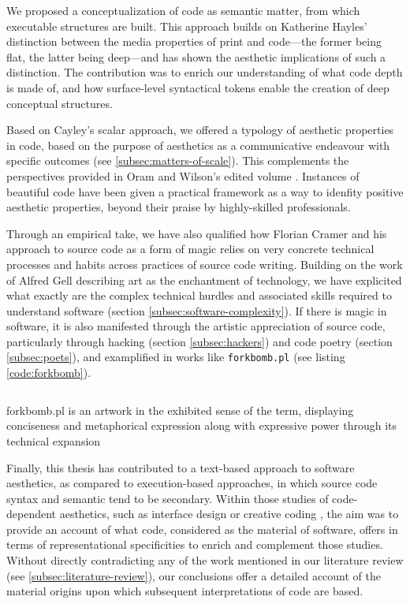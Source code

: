 We proposed a conceptualization of code as semantic matter, from which executable structures are built. This approach builds on Katherine Hayles' distinction between the media properties of print and code—the former being flat, the latter being deep—and has shown the aesthetic implications of such a distinction. The contribution was to enrich our understanding of what code depth is made of, and how surface-level syntactical tokens enable the creation of deep conceptual structures.

Based on Cayley's scalar approach, we offered a typology of aesthetic properties in code, based on the purpose of aesthetics as a communicative endeavour with specific outcomes (see \ref{subsec:matters-of-scale}). This complements the perspectives provided in Oram and Wilson's edited volume \citep{oram_beautiful_2007}. Instances of beautiful code have been given a practical framework as a way to idenfity positive aesthetic properties, beyond their praise by highly-skilled professionals.

Through an empirical take, we have also qualified how Florian Cramer and his approach to source code as a form of magic relies on very concrete technical processes and habits across practices of source code writing. Building on the work of Alfred Gell describing art as the enchantment of technology, we have explicited what exactly are the complex technical hurdles and associated skills required to understand software (section \ref{subsec:software-complexity}). If there is magic in software, it is also manifested through the artistic appreciation of source code, particularly through hacking (section \ref{subsec:hackers}) and code poetry (section \ref{subsec:poets}), and examplified in works like \lstinline{forkbomb.pl} (see listing \ref{code:forkbomb}).

\begin{listing}
    \inputminted{perl}{./corpus/forkbomb.pl}
    \caption{forkbomb.pl is an artwork in the exhibited sense of the term, displaying conciseness and metaphorical expression along with expressive power through its technical expansion}
    \label{code:forkbomb}
\end{listing}

Finally, this thesis has contributed to a text-based approach to software aesthetics, as compared to execution-based approaches, in which source code syntax and semantic tend to be secondary. Within those studies of code-dependent aesthetics, such as interface design \citep{fishwick_aesthetic_2000} or creative coding \citep{cox_aesthetic_2020}, the aim was to provide an account of what code, considered as the material of software, offers in terms of representational specificities to enrich and complement those studies. Without directly contradicting any of the work mentioned in our literature review (see \ref{subsec:literature-review}), our conclusions offer a detailed account of the material origins upon which subsequent interpretations of code are based.

